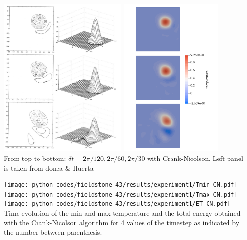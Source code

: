 \begin{center}
\includegraphics[height=8cm]{python_codes/fieldstone_43/results/experiment1/dohu03}
\includegraphics[height=8cm]{python_codes/fieldstone_43/results/experiment1/temps_30_60_120}\\
{\small From top to bottom: $\delta t=2\pi/120,2\pi/60,2\pi/30$ with Crank-Nicolson. Left panel is taken from donea \& Huerta \cite{dohu03}}
\end{center}

\begin{center}
\texttt{[image: python\_codes/fieldstone\_43/results/experiment1/Tmin\_CN.pdf]}
\texttt{[image: python\_codes/fieldstone\_43/results/experiment1/Tmax\_CN.pdf]}
\texttt{[image: python\_codes/fieldstone\_43/results/experiment1/ET\_CN.pdf]}\\
{\small Time evolution of the min and max temperature and the total energy obtained with the Crank-Nicolson algorithm for 4 values of the timestep as indicated by the number between parenthesis.}
\end{center}


